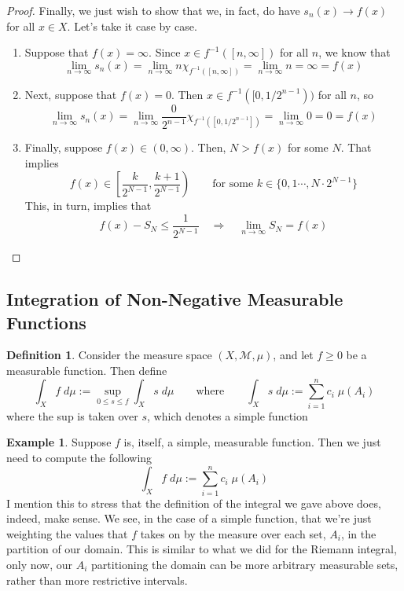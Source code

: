 \documentclass[12pt]{article}
\theoremstyle{plain}
\theoremstyle{definition}
\newtheorem{defn}[thm]{Definition}
\newtheorem{ex}[thm]{Example}
\theoremstyle{remark}
\begin{document}
\begin{proof}
Finally, we just wish to show that we, in fact, do have $s_n(x)\rightarrow f(x)$ for all $x\in X$. Let's take it case by case.
\begin{enumerate}
\item Suppose that $f(x)=\infty$. Since $x\in f^{-1}([n,\infty])$ for all $n$, we know that 
\[
    \lim_{n\rightarrow\infty} s_n(x) = \lim_{n\rightarrow\infty}
    n\chi_{f^{-1}([n,\infty])} = \lim_{n\rightarrow\infty}
    n = \infty = f(x)
\]
\item Next, suppose that $f(x) = 0$. Then $x\in f^{-1}([0,1/2^{n-1}))$ for all $n$, so 
\[
    \lim_{n\rightarrow\infty} s_n(x) = \lim_{n\rightarrow\infty}
    \frac{0}{2^{n-1}}\chi_{f^{-1}([0,1/2^{n-1}])} = 
    \lim_{n\rightarrow\infty} 0 = 0 = f(x)
\]
\item Finally, suppose $f(x)\in(0,\infty)$. Then, $N>f(x)$ for some $N$. That implies 
\[ 
    f(x) \in \left[\frac{k}{2^{N-1}}, \frac{k+1}{2^{N-1}}\right)
        \qquad
    \text{for some $k\in\{0,1\cdots,N\cdot 2^{N-1}\}$} 
\]
This, in turn, implies that
\[
    f(x) - S_N \leq \frac{1}{2^{N-1}}
    \quad \Rightarrow\quad
    \lim_{n\rightarrow\infty}  S_N  =
    f(x)
\]
\end{enumerate}

\end{proof}

\subsection{Integration of Non-Negative Measurable Functions}

\begin{defn}
Consider the measure space $(X,\mathscr{M},\mu)$, and let $f\geq0$ be a measurable function. Then define
\[
    \int_X f \; d\mu := \sup_{0\leq s\leq f} \int_X s \; d\mu
    \qquad \text{where}\qquad
    \int_X s \; d\mu := \sum^n_{i=1} c_i \; \mu(A_i)
\]
where the sup is taken over $s$, which denotes a simple function
\end{defn}

\begin{ex}
Suppose $f$ is, itself, a simple, measurable function. Then we just need to compute the following
\[
    \int_X f \; d\mu := \sum^n_{i=1} c_i \; \mu(A_i)
\]
I mention this to stress that the definition of the integral we gave above does, indeed, make sense. We see, in the case of a simple function, that we're just weighting the values that $f$ takes on by the measure over each set, $A_i$, in the partition of our domain. This is similar to what we did for the Riemann integral, only now, our $A_i$ partitioning the domain can be more arbitrary measurable sets, rather than more restrictive intervals.
\end{ex}
\end{document}
